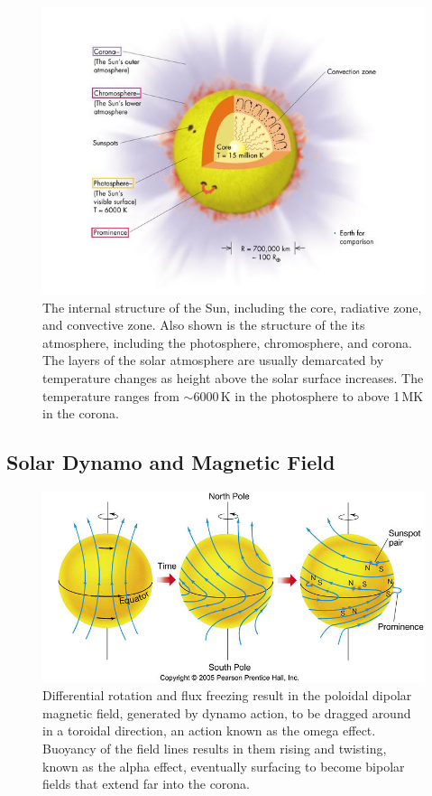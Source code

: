 \begin{figure}[!h]
\begin{center}
\includegraphics[trim = 0cm 0.5cm 0cm 0cm, width=1.0\textwidth]{images/solar_atmosphere}
\caption{The internal structure of the Sun, including the core, radiative zone, and convective zone.  Also shown is the structure of the its atmosphere, including the photosphere, chromosphere, and corona. The layers of the solar atmosphere are usually demarcated by temperature changes as height above the solar surface increases. The temperature ranges from $\sim$6000\,K in the photosphere to above 1\,MK in the corona.}
\label{fig:solar_atmosphere} 
\end{center}
\end{figure}



\subsection{Solar Dynamo and Magnetic Field}\label{sec:11}

\begin{figure}[!h]
\begin{center}
\includegraphics[]{images/Babcock}
\caption{Differential rotation and flux freezing result in the poloidal dipolar magnetic field, generated by dynamo action, to be dragged around in a toroidal direction, an action known as the omega effect. Buoyancy of the field lines results in them rising and twisting, known as the alpha effect, eventually surfacing to become bipolar fields that extend far into the corona.}
\label{fig:Babcock} 
\end{center}
\end{figure}

